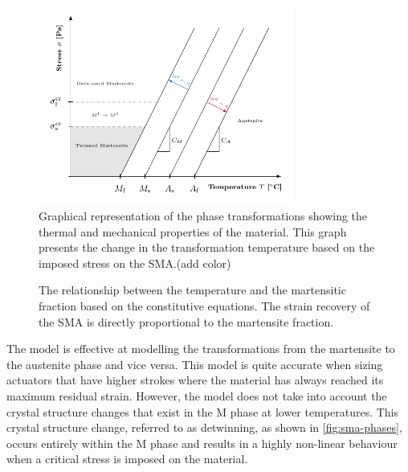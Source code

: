 \begin{figure}[hbt]
    \centering
    \includegraphics[width=0.75\textwidth]{images/chap2/phase-diagram-graph.pdf}
    \caption{Graphical representation of the phase transformations showing the thermal and mechanical properties of the material. This graph presents the change in the transformation temperature based on the imposed stress on the SMA.\todocite(add color)}
    \label{fig:phase-diagram-graph}
\end{figure}

\begin{figure}[hbt]
    \centering
    \resizebox{0.75\textwidth}{!}{}
    \caption{The relationship between the temperature and the martensitic fraction based on the \cite{brinsonOneDimensionalConstitutiveBehavior1993} constitutive equations. The strain recovery of the SMA is directly proportional to the martensite fraction.}
    \label{fig:sma-temperature-transformation-model}
\end{figure}

The \cite{liangConstitutiveModelingShape1990a} model is effective at modelling the transformations from the martensite to the austenite phase and vice versa. This model is quite accurate when sizing actuators that have higher strokes where the material has always reached its maximum residual strain. However, the model does not take into account the crystal structure changes that exist in the M phase at lower temperatures. This crystal structure change, referred to as detwinning, as shown in \cref{fig:sma-phases}, occurs entirely within the M phase and results in a highly non-linear behaviour when a critical stress is imposed on the material.

